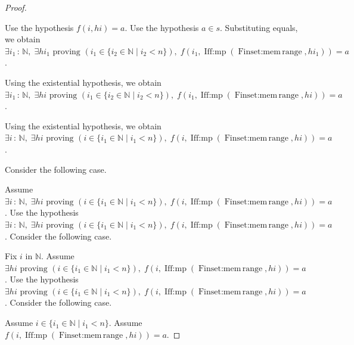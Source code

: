 \documentclass{article}
\theoremstyle{paperresult}
\newenvironment{proofstep}{\par\smallskip\ifdim\leftskip<3em\relax\advance\leftskip by 1em\relax\fi\noindent\ignorespaces}{\par\smallskip}
\begin{document}
\begin{proof}
\begin{proofstep}
\begin{proofstep}
\begin{proofstep}
\begin{proofstep}
\begin{proofstep}
\end{proofstep}
Use the hypothesis \(f\left(i, \mathit{hi}\right) = a\).
Use the hypothesis \(a \in s\).
Substituting equals, we obtain \(\exists i_{1}\, :\, \mathbb{N},\; \exists \mathit{hi}_{1}\text{ proving }(i_{1} \in \{i_{2}\in\mathbb{N}\mid i_{2}<n\}),\; f(i_{1},\allowbreak{} \operatorname{Iff\mathord{:}mp}(\operatorname{Finset\mathord{:}mem\,range},\allowbreak{} \mathit{hi}_{1})) = a\).
\end{proofstep}
Using the existential hypothesis, we obtain \(\exists i_{1}\, :\, \mathbb{N},\; \exists \mathit{hi}\text{ proving }(i_{1} \in \{i_{2}\in\mathbb{N}\mid i_{2}<n\}),\; f(i_{1},\allowbreak{} \operatorname{Iff\mathord{:}mp}(\operatorname{Finset\mathord{:}mem\,range},\allowbreak{} \mathit{hi})) = a\).
\end{proofstep}
Using the existential hypothesis, we obtain \(\exists i\, :\, \mathbb{N},\; \exists \mathit{hi}\text{ proving }(i \in \{i_{1}\in\mathbb{N}\mid i_{1}<n\}),\; f(i,\allowbreak{} \operatorname{Iff\mathord{:}mp}(\operatorname{Finset\mathord{:}mem\,range},\allowbreak{} \mathit{hi})) = a\).
\end{proofstep}
Consider the following case.
\begin{proofstep}
Assume \(\exists i\, :\, \mathbb{N},\; \exists \mathit{hi}\text{ proving }(i \in \{i_{1}\in\mathbb{N}\mid i_{1}<n\}),\; f(i,\allowbreak{} \operatorname{Iff\mathord{:}mp}(\operatorname{Finset\mathord{:}mem\,range},\allowbreak{} \mathit{hi})) = a\).
Use the hypothesis \(\exists i\, :\, \mathbb{N},\; \exists \mathit{hi}\text{ proving }(i \in \{i_{1}\in\mathbb{N}\mid i_{1}<n\}),\; f(i,\allowbreak{} \operatorname{Iff\mathord{:}mp}(\operatorname{Finset\mathord{:}mem\,range},\allowbreak{} \mathit{hi})) = a\).
Consider the following case.
\begin{proofstep}
Fix \(i\) in \(\mathbb{N}\).
Assume \(\exists \mathit{hi}\text{ proving }(i \in \{i_{1}\in\mathbb{N}\mid i_{1}<n\}),\; f(i,\allowbreak{} \operatorname{Iff\mathord{:}mp}(\operatorname{Finset\mathord{:}mem\,range},\allowbreak{} \mathit{hi})) = a\).
Use the hypothesis \(\exists \mathit{hi}\text{ proving }(i \in \{i_{1}\in\mathbb{N}\mid i_{1}<n\}),\; f(i,\allowbreak{} \operatorname{Iff\mathord{:}mp}(\operatorname{Finset\mathord{:}mem\,range},\allowbreak{} \mathit{hi})) = a\).
Consider the following case.
\begin{proofstep}
Assume \(i \in \{i_{1}\in\mathbb{N}\mid i_{1}<n\}\).
Assume \(f(i,\allowbreak{} \operatorname{Iff\mathord{:}mp}(\operatorname{Finset\mathord{:}mem\,range},\allowbreak{} \mathit{hi})) = a\).

\end{proofstep}
\end{proofstep}
\end{proofstep}
\end{proofstep}
\end{proof}
\end{document}
